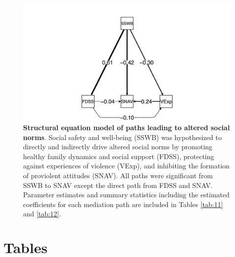 \documentclass[utf8]{article}
\begin{document}
\begin{figure}[h!]
\includegraphics[width=\textwidth,height=\textheight,keepaspectratio]{Fig-2}
\caption{\textbf{Structural equation model of paths leading to altered social norms}. Social safety and well-being (SSWB) was hypothesized to directly and indirectly drive altered social norms by promoting healthy family dynamics and social support (FDSS), protecting against experiences of violence (VExp), and inhibiting the formation of proviolent attitudes (SNAV). All paths were significant from SSWB to SNAV except the direct path from FDSS and SNAV. Parameter estimates and summary statistics including the estimated coefficients for each mediation path are included in Tables \ref{tab:11} and \ref{tab:12}. \label{fig:2}}
\end{figure}

\clearpage
\section*{Tables}
\end{document}
